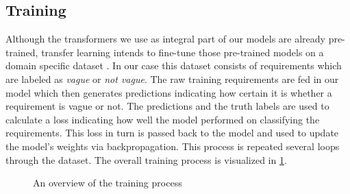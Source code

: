 \subsection{Training}
\label{chp:study:sec:design:subsec:training}
Although the transformers we use as integral part of our models are already pre-trained, transfer learning intends to fine-tune those pre-trained models on a domain specific dataset \parencite{Pan:2010}.
In our case this dataset consists of requirements which are labeled as \textit{vague} or \textit{not vague}.
The raw training requirements are fed in our model which then generates predictions indicating how certain it is whether a requirement is vague or not.
The predictions and the truth labels are used to calculate a loss indicating how well the model performed on classifying the requirements.
This loss in turn is passed back to the model and used to update the model's weights via backpropagation.
This process is repeated several loops through the dataset.
The overall training process is visualized in \cref{fig:study:design:training}.

\begin{figure}[htpb]
    \centering
    \def\svgwidth{\columnwidth}
    
    \caption[Study Design: Training]{An overview of the training process}\label{fig:study:design:training}
\end{figure}
